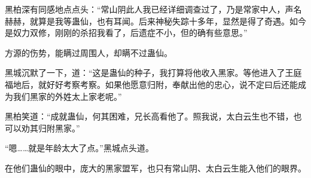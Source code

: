 \begin{this_body}
黑柏深有同感地点点头：“常山阴此人我已经详细调查过了，乃是常家中人，声名赫赫，就算是我等蛊仙，也有耳闻。后来神秘失踪十多年，显然是得了奇遇。如今是奴力双修，刚刚的杀招我看了，后遗症不小，但的确有些意思。”

方源的伤势，能瞒过周围人，却瞒不过蛊仙。

黑城沉默了一下，道：“这是蛊仙的种子，我打算将他收入黑家。等他进入了王庭福地后，就好好考察考察。如果他愿意归附，奉献出他的忠心，说不定曰后还能成为我们黑家的外姓太上家老呢。”

黑柏笑道：“成就蛊仙，何其困难，兄长高看他了。照我说，太白云生也不错，也可以劝其归附黑家。”

“嗯……就是年龄太大了点。”黑城点头道。

在他们蛊仙的眼中，庞大的黑家盟军，也只有常山阴、太白云生能入他们的眼界。

\end{this_body}

